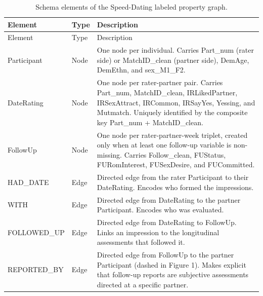 \documentclass[sn-apa,pdflatex]{sn-jnl}
\theoremstyle{remark}
\theoremstyle{definition}
\begin{document}
\begin{longtable}[]{@{}
  >{\raggedright\arraybackslash}p{}
  >{\raggedright\arraybackslash}p{}
  >{\raggedright\arraybackslash}p{}@{}}
\caption{Schema elements of the Speed-Dating labeled property
graph.}\tabularnewline
\toprule\noalign{}
\begin{minipage}[b]{\linewidth}\raggedright
Element
\end{minipage} & \begin{minipage}[b]{\linewidth}\raggedright
Type
\end{minipage} & \begin{minipage}[b]{\linewidth}\raggedright
Description
\end{minipage} \\
\midrule\noalign{}
\endfirsthead
\toprule\noalign{}
\begin{minipage}[b]{\linewidth}\raggedright
Element
\end{minipage} & \begin{minipage}[b]{\linewidth}\raggedright
Type
\end{minipage} & \begin{minipage}[b]{\linewidth}\raggedright
Description
\end{minipage} \\
\midrule\noalign{}
\endhead
\bottomrule\noalign{}
\endlastfoot
Participant & Node & One node per individual. Carries Part\_num (rater
side) or MatchID\_clean (partner side), DemAge, DemEthn, and
sex\_M1\_F2. \\
DateRating & Node & One node per rater-partner pair. Carries Part\_num,
MatchID\_clean, IRLikedPartner, IRSexAttract, IRCommon, IRSayYes,
Yessing, and Mutmatch. Uniquely identified by the composite key
Part\_num + MatchID\_clean. \\
FollowUp & Node & One node per rater-partner-week triplet, created only
when at least one follow-up variable is non-missing. Carries
Follow\_clean, FUStatus, FURomInterest, FUSexDesire, and FUCommitted. \\
HAD\_DATE & Edge & Directed edge from the rater Participant to their
DateRating. Encodes who formed the impressions. \\
WITH & Edge & Directed edge from DateRating to the partner Participant.
Encodes who was evaluated. \\
FOLLOWED\_UP & Edge & Directed edge from DateRating to FollowUp. Links
an impression to the longitudinal assessments that followed it. \\
REPORTED\_BY & Edge & Directed edge from FollowUp to the partner
Participant (dashed in Figure 1). Makes explicit that follow-up reports
are subjective assessments directed at a specific partner. \\
\end{longtable}
\end{document}
